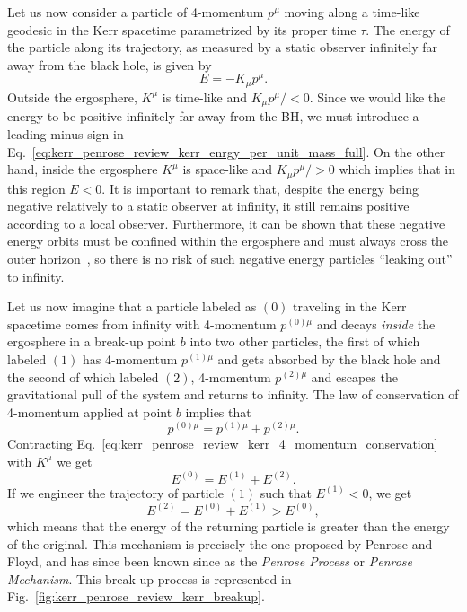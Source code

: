 Let us now consider a particle of 4-momentum $p^\mu$ moving along a time-like geodesic in the Kerr spacetime parametrized by its proper time $\tau$. The energy of the particle along its trajectory, as measured by a static observer infinitely far away from the black hole, is given by
%
\begin{equation}
  E = -K_\mu p^\mu.
  \label{eq:kerr_penrose_review_kerr_enrgy_per_unit_mass_full}
\end{equation}
%
Outside the ergosphere, $K^\mu$ is time-like and $K_\mu p^\mu/<0$. Since we would like the energy to be positive infinitely far away from the BH, we must introduce a leading minus sign in Eq.~\eqref{eq:kerr_penrose_review_kerr_enrgy_per_unit_mass_full}. On the other hand, inside the ergosphere $K^\mu$ is space-like and $K_\mu p^\mu/ >0$ which implies that in this region $E < 0$. It is important to remark that, despite the energy being negative relatively to a static observer at infinity, it still remains positive according to a local observer. Furthermore, it can be shown that these negative energy orbits must be confined within the ergosphere and must always cross the outer horizon~\cite{Grib:2013hxa,Contopoulos1984}, so there is no risk of such negative energy particles ``leaking out'' to infinity.

Let us now imagine that a particle labeled as $(0)$ traveling in the Kerr spacetime comes from infinity with 4-momentum $p^{(0)\mu}$ and decays \emph{inside} the ergosphere in a break-up point $b$ into two other particles, the first of which labeled $(1)$ has 4-momentum $p^{(1)\mu}$ and gets absorbed by the black hole and the second of which labeled $(2)$, 4-momentum $p^{(2)\mu}$ and escapes the gravitational pull of the system and returns to infinity. The law of conservation of 4-momentum applied at point $b$ implies that
%
\begin{equation}
  p^{(0)\mu} = p^{(1)\mu} + p^{(2)\mu}.
  \label{eq:kerr_penrose_review_kerr_4_momentum_conservation}
\end{equation}
%
Contracting Eq.~\eqref{eq:kerr_penrose_review_kerr_4_momentum_conservation} with $K^\mu$ we get
\begin{equation}
  E^{(0)} = E^{(1)} + E^{(2)}.
  \label{eq:kerr_penrose_review_kerr_energy_conservation}
\end{equation}
%
If we engineer the trajectory of particle $(1)$ such that $E^{(1)} < 0$, we get
\begin{equation}
  E^{(2)} = E^{(0)} + E^{(1)} > E^{(0)},
  \label{eq:kerr_penrose_review_kerr_energy_increase}
\end{equation}
%
which means that the energy of the returning particle is greater than the energy of the original. This mechanism is precisely the one proposed by Penrose and Floyd, and has since been known since as the \emph{Penrose Process} or \emph{Penrose Mechanism}. This break-up process is represented in Fig.~\ref{fig:kerr_penrose_review_kerr_breakup}.

